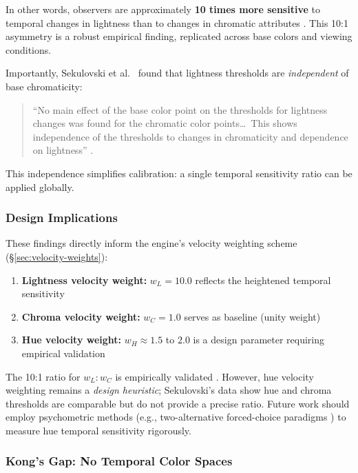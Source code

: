 In other words, observers are approximately \textbf{10 times more sensitive} to temporal changes in lightness than to changes in chromatic attributes \citep{sekulovski2007}. This 10:1 asymmetry is a robust empirical finding, replicated across base colors and viewing conditions.

Importantly, Sekulovski et al.\ \citeyearpar{sekulovski2007} found that lightness thresholds are \emph{independent} of base chromaticity:

\begin{quote}
``No main effect of the base color point on the thresholds for lightness changes was found for the chromatic color points\ldots\ This shows independence of the thresholds to changes in chromaticity and dependence on lightness'' \citep[Results section]{sekulovski2007}.
\end{quote}

This independence simplifies calibration: a single temporal sensitivity ratio can be applied globally.

\subsubsection{Design Implications}

These findings directly inform the engine's velocity weighting scheme (\S\ref{sec:velocity-weights}):

\begin{enumerate}
    \item \textbf{Lightness velocity weight:} $w_L = 10.0$ reflects the heightened temporal sensitivity \citep{sekulovski2007}
    \item \textbf{Chroma velocity weight:} $w_C = 1.0$ serves as baseline (unity weight)
    \item \textbf{Hue velocity weight:} $w_H \approx 1.5$ to $2.0$ is a design parameter requiring empirical validation
\end{enumerate}

The 10:1 ratio for $w_L : w_C$ is empirically validated \citep{sekulovski2007}. However, hue velocity weighting remains a \emph{design heuristic}; Sekulovski's data show hue and chroma thresholds are comparable but do not provide a precise ratio. Future work should employ psychometric methods (e.g., two-alternative forced-choice paradigms \citep{wang2022}) to measure hue temporal sensitivity rigorously.

\subsubsection{Kong's Gap: No Temporal Color Spaces}

